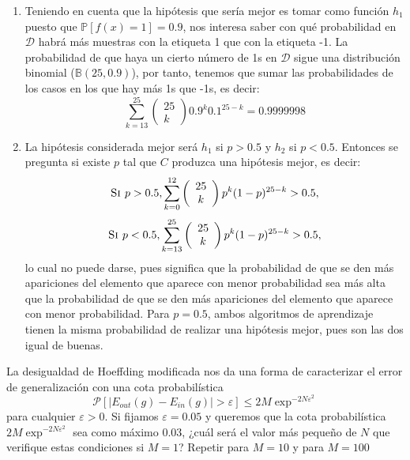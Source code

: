 \documentclass[11pt,leqno]{article}
\theoremstyle{definition}
\begin{document}
\begin{solucion}
\begin{enumerate}[a]
\item Teniendo en cuenta que la hipótesis que sería mejor es tomar como función $h_1$ puesto que $\mathbb{P}[f(x)=1]=0.9$, nos interesa saber con qué probabilidad en $\mathcal{D}$ habrá más muestras con la etiqueta 1 que con la etiqueta -1. La probabilidad de que haya un cierto número de 1s en $\mathcal{D}$ sigue una distribución binomial ($\mathbb{B}(25,0.9)$), por tanto, tenemos que sumar las probabilidades de los casos en los que hay más 1s que -1s, es decir:
	\[ \sum\limits_{k=13}^{25} \left(\begin{array}{c} 25\\k\end{array} \right)
								0.9^k 0.1^{25-k} = 0.9999998	\]

\item La hipótesis considerada mejor será $h_1$ si $p>0.5$ y $h_2$ si $p<0.5$. Entonces se pregunta si existe $p$ tal que $C$ produzca una hipótesis mejor, es decir:
	\[ \textsc{Si } p>0.5, \sum\limits_{k=0}^{12} 
				\left(\begin{array}{c} 25\\k\end{array} \right)
				p^k (1-p)^{25-k} > 0.5, \]
	\[ \textsc{Si } p<0.5, \sum\limits_{k=13}^{25} 
				\left(\begin{array}{c} 25\\k\end{array} \right)
				p^k (1-p)^{25-k} > 0.5, \]
	lo cual no puede darse, pues significa que la probabilidad de que se den más apariciones del elemento que aparece con menor probabilidad sea más alta que la probabilidad de que se den más apariciones del elemento que aparece con menor probabilidad. Para $p=0.5$, ambos algoritmos de aprendizaje tienen la misma probabilidad de realizar una hipótesis mejor, pues son las dos igual de buenas.
\end{enumerate}
\end{solucion}

\begin{cuestion}
La desigualdad de Hoeffding modificada nos da una forma de caracterizar el error de generalización con una cota probabilística
\[ \mathcal{P}[ \vert E_{out}(g) - E_{in}(g) \vert > \varepsilon ]
	\leq 2M\exp^{-2N \varepsilon^2} \]
para cualquier $\varepsilon > 0$. Si fijamos $\varepsilon = 0.05$ y queremos que la cota probabilística $ 2 M \exp^{-2N\varepsilon^2 } $ sea como máximo $0.03$, ¿cuál será el valor más pequeño de $N$ que verifique estas condiciones si $M = 1$? Repetir para $M = 10$ y para $M = 100$
\end{cuestion}
\end{document}
